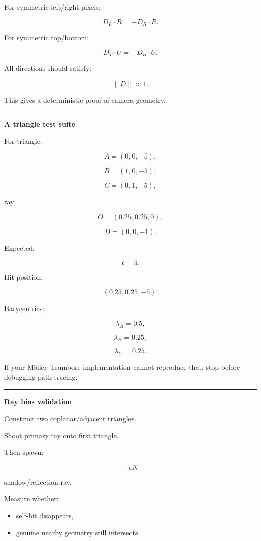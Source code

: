 For symmetric left/right pixels:

\[
D_L\cdot R
=
-
D_R\cdot R.
\]

For symmetric top/bottom:

\[
D_T\cdot U
=
-
D_B\cdot U.
\]

All directions should satisfy:

\[
\|D\|\approx1.
\]

This gives a deterministic proof of camera geometry.

\begin{center}\rule{0.5\linewidth}{0.5pt}\end{center}

\textbf{A triangle test suite}

For triangle:

\[
A=(0,0,-5),
\]

\[
B=(1,0,-5),
\]

\[
C=(0,1,-5),
\]

ray:

\[
O=(0.25,0.25,0),
\]

\[
D=(0,0,-1).
\]

Expected:

\[
t=5.
\]

Hit position:

\[
(0.25,0.25,-5).
\]

Barycentrics:

\[
\lambda_A=0.5,
\]

\[
\lambda_B=0.25,
\]

\[
\lambda_C=0.25.
\]

If your Möller--Trumbore implementation cannot reproduce that, stop before debugging path tracing.

\begin{center}\rule{0.5\linewidth}{0.5pt}\end{center}

\textbf{Ray bias validation}

Construct two coplanar/adjacent triangles.

Shoot primary ray onto first triangle.

Then spawn:

\[
+\epsilon N
\]

shadow/reflection ray.

Measure whether:

\begin{itemize}
\tightlist
\item
  self-hit disappears,
\item
  genuine nearby geometry still intersects.
\end{itemize}

